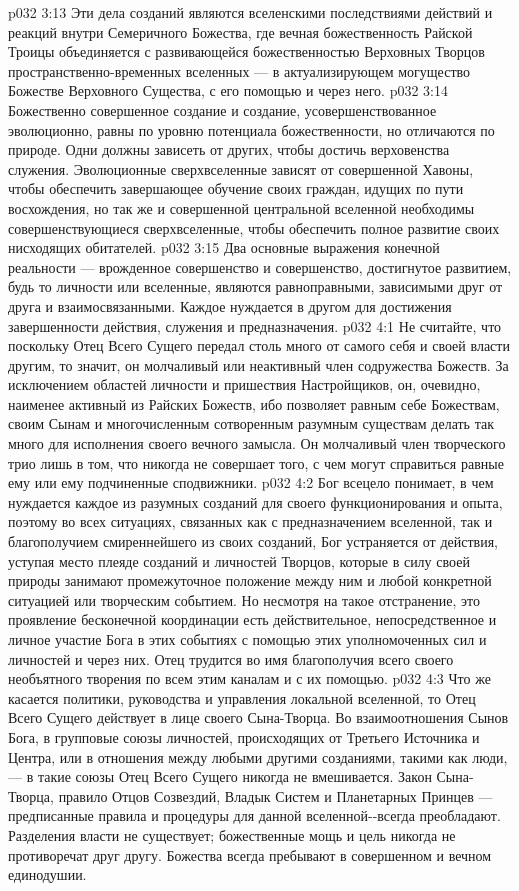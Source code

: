 \vs p032 3:13 Эти дела созданий являются вселенскими последствиями действий и реакций внутри Семеричного Божества, где вечная божественность Райской Троицы объединяется с развивающейся божественностью Верховных Творцов пространственно\hyp{}временных вселенных --- в актуализирующем могущество Божестве Верховного Существа, с его помощью и через него.
\vs p032 3:14 Божественно совершенное создание и создание, усовершенствованное эволюционно, равны по уровню потенциала божественности, но отличаются по природе. Одни должны зависеть от других, чтобы достичь верховенства служения. Эволюционные сверхвселенные зависят от совершенной Хавоны, чтобы обеспечить завершающее обучение своих граждан, идущих по пути восхождения, но так же и совершенной центральной вселенной необходимы совершенствующиеся сверхвселенные, чтобы обеспечить полное развитие своих нисходящих обитателей.
\vs p032 3:15 Два основные выражения конечной реальности --- врожденное совершенство и совершенство, достигнутое развитием, будь то личности или вселенные, являются равноправными, зависимыми друг от друга и взаимосвязанными. Каждое нуждается в другом для достижения завершенности действия, служения и предназначения.
\vs p032 4:1 Не считайте, что поскольку Отец Всего Сущего передал столь много от самого себя и своей власти другим, то значит, он молчаливый или неактивный член содружества Божеств. За исключением областей личности и пришествия Настройщиков, он, очевидно, наименее активный из Райских Божеств, ибо позволяет равным себе Божествам, своим Сынам и многочисленным сотворенным разумным существам делать так много для исполнения своего вечного замысла. Он молчаливый член творческого трио лишь в том, что никогда не совершает того, с чем могут справиться равные ему или ему подчиненные сподвижники.
\vs p032 4:2 Бог всецело понимает, в чем нуждается каждое из разумных созданий для своего функционирования и опыта, поэтому во всех ситуациях, связанных как с предназначением вселенной, так и благополучием смиреннейшего из своих созданий, Бог устраняется от действия, уступая место плеяде созданий и личностей Творцов, которые в силу своей природы занимают промежуточное положение между ним и любой конкретной ситуацией или творческим событием. Но несмотря на такое отстранение, это проявление бесконечной координации есть действительное, непосредственное и личное участие Бога в этих событиях с помощью этих уполномоченных сил и личностей и через них. Отец трудится во имя благополучия всего своего необъятного творения по всем этим каналам и с их помощью.
\vs p032 4:3 \pc Что же касается политики, руководства и управления локальной вселенной, то Отец Всего Сущего действует в лице своего Сына\hyp{}Творца. Во взаимоотношения Сынов Бога, в групповые союзы личностей, происходящих от Третьего Источника и Центра, или в отношения между любыми другими созданиями, такими как люди, --- в такие союзы Отец Всего Сущего никогда не вмешивается. Закон Сына\hyp{}Творца, правило Отцов Созвездий, Владык Систем и Планетарных Принцев --- предписанные правила и процедуры для данной вселенной\hyp{}\hyp{}всегда преобладают. Разделения власти не существует; божественные мощь и цель никогда не противоречат друг другу. Божества всегда пребывают в совершенном и вечном единодушии.
